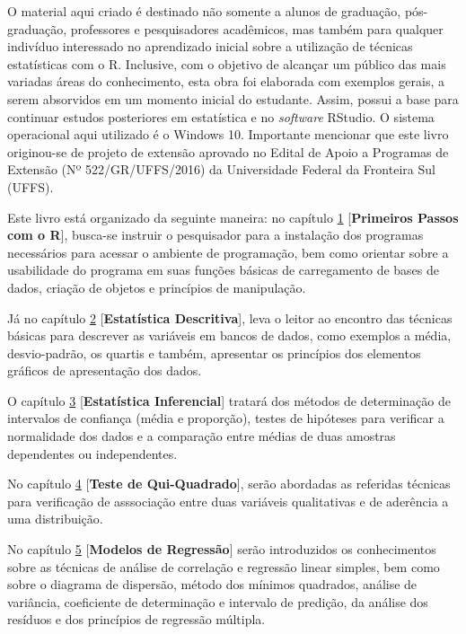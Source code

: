 \documentclass[12pt,brazil,oneside]{book}
\begin{document}
O material aqui criado é destinado não somente a alunos de graduação, pós-graduação, professores e pesquisadores acadêmicos, mas também para qualquer indivíduo interessado no aprendizado inicial sobre a utilização de técnicas estatísticas com o R. Inclusive, com o objetivo de alcançar um público das mais variadas áreas do conhecimento, esta obra foi elaborada com exemplos gerais, a serem absorvidos em um momento inicial do estudante. Assim, possui a base para continuar estudos posteriores em estatística e no \emph{software} RStudio. O sistema operacional aqui utilizado é o Windows 10. Importante mencionar que este livro originou-se de projeto de extensão aprovado no Edital de Apoio a Programas de Extensão (Nº 522/GR/UFFS/2016) da Universidade Federal da Fronteira Sul (UFFS).

Este livro está organizado da seguinte maneira: no capítulo \protect\hyperlink{intro}{1} {[}\textbf{Primeiros Passos com o R}{]}, busca-se instruir o pesquisador para a instalação dos programas necessários para acessar o ambiente de programação, bem como orientar sobre a usabilidade do programa em suas funções básicas de carregamento de bases de dados, criação de objetos e princípios de manipulação.

Já no capítulo \protect\hyperlink{desc}{2} {[}\textbf{Estatística Descritiva}{]}, leva o leitor ao encontro das técnicas básicas para descrever as variáveis em bancos de dados, como exemplos a média, desvio-padrão, os quartis e também, apresentar os princípios dos elementos gráficos de apresentação dos dados.

O capítulo \protect\hyperlink{inf}{3} {[}\textbf{Estatística Inferencial}{]} tratará dos métodos de determinação de intervalos de confiança (média e proporção), testes de hipóteses para verificar a normalidade dos dados e a comparação entre médias de duas amostras dependentes ou independentes.

No capítulo \protect\hyperlink{qui}{4} {[}\textbf{Teste de Qui-Quadrado}{]}, serão abordadas as referidas técnicas para verificação de asssociação entre duas variáveis qualitativas e de aderência a uma distribuição.

No capítulo \protect\hyperlink{reg}{5} {[}\textbf{Modelos de Regressão}{]} serão introduzidos os conhecimentos sobre as técnicas de análise de correlação e regressão linear simples, bem como sobre o diagrama de dispersão, método dos mínimos quadrados, análise de variância, coeficiente de determinação e intervalo de predição, da análise dos resíduos e dos princípios de regressão múltipla.
\end{document}
